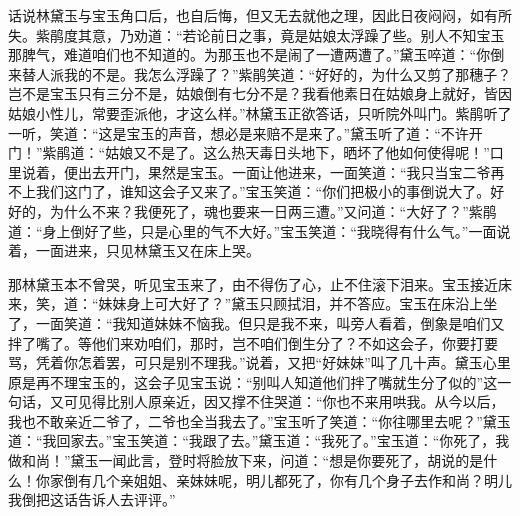 \documentclass[12pt,oneside]{book}
\begin{document}
话说林黛玉与宝玉角口后，也自后悔，但又无去就他之理，因此日夜闷闷，如有所失。紫鹃度其意，乃劝道：“若论前日之事，竟是姑娘太浮躁了些。别人不知宝玉那脾气，难道咱们也不知道的。为那玉也不是闹了一遭两遭了。”黛玉啐道：“你倒来替人派我的不是。我怎么浮躁了？”紫鹃笑道：“好好的，为什么又剪了那穗子？岂不是宝玉只有三分不是，姑娘倒有七分不是？我看他素日在姑娘身上就好，皆因姑娘小性儿，常要歪派他，才这么样。”林黛玉正欲答话，只听院外叫门。紫鹃听了一听，笑道：“这是宝玉的声音，想必是来赔不是来了。”黛玉听了道：“不许开门！”紫鹃道：“姑娘又不是了。这么热天毒日头地下，晒坏了他如何使得呢！”口里说着，便出去开门，果然是宝玉。一面让他进来，一面笑道：“我只当宝二爷再不上我们这门了，谁知这会子又来了。”宝玉笑道：“你们把极小的事倒说大了。好好的，为什么不来？我便死了，魂也要来一日两三遭。”又问道：“大好了？”紫鹃道：“身上倒好了些，只是心里的气不大好。”宝玉笑道：“我晓得有什么气。”一面说着，一面进来，只见林黛玉又在床上哭。

那林黛玉本不曾哭，听见宝玉来了，由不得伤了心，止不住滚下泪来。宝玉接近床来，笑，道：“妹妹身上可大好了？”黛玉只顾拭泪，并不答应。宝玉在床沿上坐了，一面笑道：“我知道妹妹不恼我。但只是我不来，叫旁人看着，倒象是咱们又拌了嘴了。等他们来劝咱们，那时，岂不咱们倒生分了？不如这会子，你要打要骂，凭着你怎着罢，可只是别不理我。”说着，又把“好妹妹”叫了几十声。黛玉心里原是再不理宝玉的，这会子见宝玉说：“别叫人知道他们拌了嘴就生分了似的”这一句话，又可见得比别人原亲近，因又撑不住哭道：“你也不来用哄我。从今以后，我也不敢亲近二爷了，二爷也全当我去了。”宝玉听了笑道：“你往哪里去呢？”黛玉道：“我回家去。”宝玉笑道：“我跟了去。”黛玉道：“我死了。”宝玉道：“你死了，我做和尚！”黛玉一闻此言，登时将脸放下来，问道：“想是你要死了，胡说的是什么！你家倒有几个亲姐姐、亲妹妹呢，明儿都死了，你有几个身子去作和尚？明儿我倒把这话告诉人去评评。”
\end{document}

